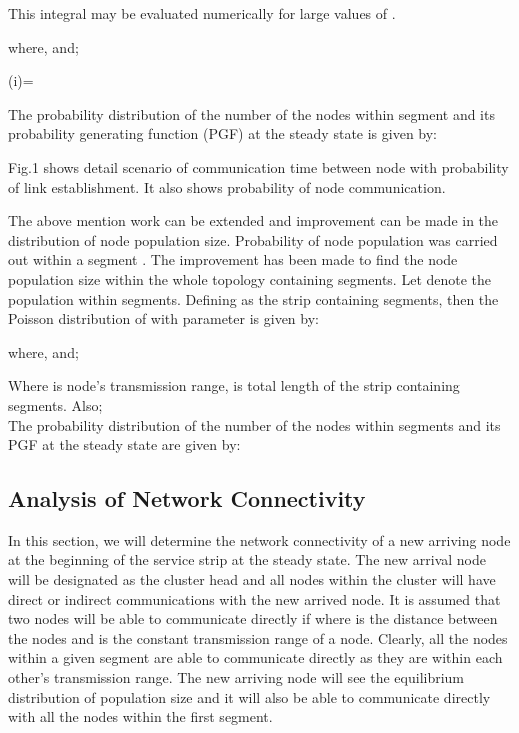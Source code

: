 \documentclass[journal]{IEEEtran}
\begin{document}
\small

\normalsize

This integral may be evaluated numerically for large values of .



where,  and;


(i)=

\tiny

\normalsize
The probability distribution of the number of the nodes within segment  and its probability generating function (PGF) at the steady state is given by:
\small

\normalsize

Fig.1 shows detail scenario of communication time between node with probability of link establishment. It also shows probability of node communication.




The above mention work can be extended and improvement can be made in the distribution of node population size. Probability of node population was carried out within a segment . The improvement has been made to find the node population size within the whole topology containing  segments. Let  denote the population within  segments. Defining  as the strip containing  segments, then the Poisson distribution of  with parameter  is given by:
\small

\normalsize
where,  and;

\tiny

\normalsize
Where  is node's transmission range,  is total length of the strip containing  segments.
Also;\\

The probability distribution of the number of the nodes within  segments and its PGF at the steady state are given by:
\tiny

\normalsize

\subsection{Analysis of Network Connectivity}
In this section, we will determine the network connectivity of a new arriving node at the beginning of the service strip at the steady state.
The new arrival node will be designated as the cluster head and all nodes within the cluster will have direct or indirect communications with the new arrived node. It is assumed that two nodes will be able to communicate directly if  where  is the distance between the nodes and  is the constant transmission range of a node. Clearly, all the nodes within a given segment are able to communicate directly as they are within each other's transmission range. The new arriving node will see the equilibrium distribution of population size and it will also be able to communicate directly with all the nodes within the first segment.
\end{document}

